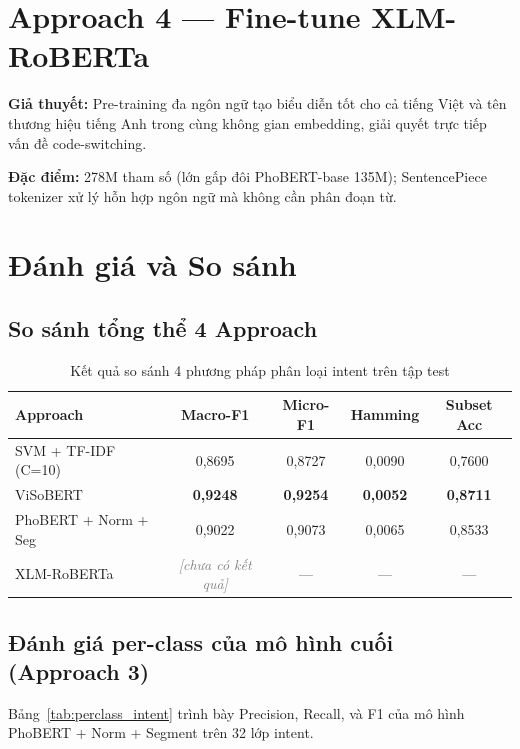 \documentclass[12pt, a4paper]{report}
\newcommand{\placeholder}[1]{\textit{\textcolor{gray}{[#1]}}}
\begin{document}
\section{Approach 4 — Fine-tune XLM-RoBERTa}

\textbf{Giả thuyết:} Pre-training đa ngôn ngữ tạo biểu diễn tốt
cho cả tiếng Việt và tên thương hiệu tiếng Anh trong cùng không gian embedding,
giải quyết trực tiếp vấn đề code-switching.

\textbf{Đặc điểm:} 278M tham số (lớn gấp đôi PhoBERT-base 135M);
SentencePiece tokenizer xử lý hỗn hợp ngôn ngữ mà không cần phân đoạn từ.

\section{Đánh giá và So sánh}

\subsection{So sánh tổng thể 4 Approach}

\begin{table}[H]
\centering
\caption{Kết quả so sánh 4 phương pháp phân loại intent trên tập test}
\label{tab:intent_compare}
\begin{tabular}{lcccc}
\toprule
\textbf{Approach} & \textbf{Macro-F1} & \textbf{Micro-F1} & \textbf{Hamming} & \textbf{Subset Acc} \\
\midrule
SVM + TF-IDF (C=10)   & 0,8695 & 0,8727 & 0,0090 & 0,7600 \\
ViSoBERT              & \textbf{0,9248} & \textbf{0,9254} & \textbf{0,0052} & \textbf{0,8711} \\
PhoBERT + Norm + Seg  & 0,9022 & 0,9073 & 0,0065 & 0,8533 \\
XLM-RoBERTa           & \placeholder{chưa có kết quả} & --- & --- & --- \\
\bottomrule
\end{tabular}
\end{table}

\subsection{Đánh giá per-class của mô hình cuối (Approach 3)}

Bảng~\ref{tab:perclass_intent} trình bày Precision, Recall, và F1
của mô hình PhoBERT + Norm + Segment trên 32 lớp intent.
\end{document}
